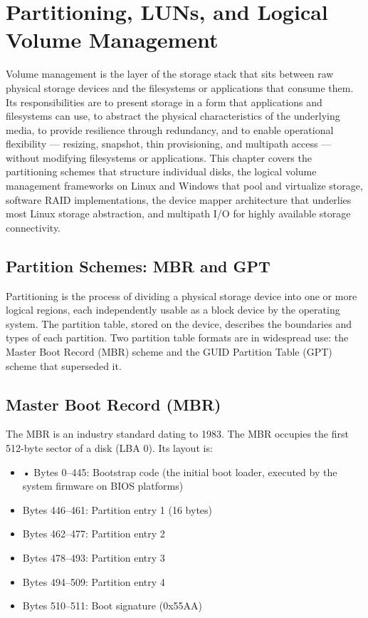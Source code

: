 \chapter{Partitioning, LUNs, and Logical Volume Management}
\label{ch:2}

Volume management is the layer of the storage stack that sits between raw physical storage devices and the filesystems or applications that consume them. Its responsibilities are to present storage in a form that applications and filesystems can use, to abstract the physical characteristics of the underlying media, to provide resilience through redundancy, and to enable operational flexibility --- resizing, snapshot, thin provisioning, and multipath access --- without modifying filesystems or applications. This chapter covers the partitioning schemes that structure individual disks, the logical volume management frameworks on Linux and Windows that pool and virtualize storage, software RAID implementations, the device mapper architecture that underlies most Linux storage abstraction, and multipath I/O for highly available storage connectivity.

\section{Partition Schemes: MBR and GPT}
Partitioning is the process of dividing a physical storage device into one or more logical regions, each independently usable as a block device by the operating system. The partition table, stored on the device, describes the boundaries and types of each partition. Two partition table formats are in widespread use: the Master Boot Record (MBR) scheme and the GUID Partition Table (GPT) scheme that superseded it.

\section{Master Boot Record (MBR)}
The MBR is an industry standard dating to 1983. The MBR occupies the first 512-byte sector of a disk (LBA 0). Its layout is:

\begin{itemize}
  \item • Bytes 0--445: Bootstrap code (the initial boot loader, executed by the system firmware on BIOS platforms)
  \item Bytes 446--461: Partition entry 1 (16 bytes)
  \item Bytes 462--477: Partition entry 2
  \item Bytes 478--493: Partition entry 3
  \item Bytes 494--509: Partition entry 4
  \item Bytes 510--511: Boot signature (0x55AA)
\end{itemize}

